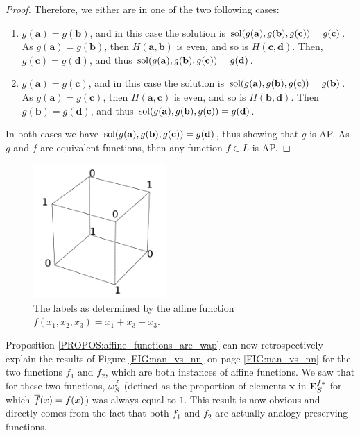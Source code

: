 \begin{proof}
  Therefore, we either are in one of the two following cases:
  \begin{enumerate}
    \item $g(\mathbf{a}) = g(\mathbf{b})$, and in this case the solution is
      $\text{sol}(g(\mathbf{a}), g(\mathbf{b}), g(\mathbf{c})) = g(\mathbf{c})$. As
      $g(\mathbf{a}) = g(\mathbf{b})$, then $H(\mathbf{a}, \mathbf{b})$ is
      even, and so is $H(\mathbf{c}, \mathbf{d})$. Then, $g(\mathbf{c}) =
      g(\mathbf{d})$, and thus $\text{sol}(g(\mathbf{a}), g(\mathbf{b}),
      g(\mathbf{c})) = g(\mathbf{d})$.
    \item $g(\mathbf{a}) = g(\mathbf{c})$, and in this case the solution is
      $\text{sol}(g(\mathbf{a}), g(\mathbf{b}), g(\mathbf{c})) = g(\mathbf{b})$. As
      $g(\mathbf{a}) = g(\mathbf{c})$, then $H(\mathbf{a}, \mathbf{c})$ is
      even, and so is $H(\mathbf{b}, \mathbf{d})$. Then $g(\mathbf{b}) =
      g(\mathbf{d})$, and thus $\text{sol}(g(\mathbf{a}), g(\mathbf{b}),
      g(\mathbf{c})) = g(\mathbf{d})$.
  \end{enumerate}

  In both cases we have $\text{sol}(g(\mathbf{a}), g(\mathbf{b}), g(\mathbf{c})) =
  g(\mathbf{d})$, thus showing that $g$ is AP.
  As $g$ and $f$ are equivalent functions, then any function $f \in L$ is AP.
\end{proof}

\begin{figure}[!h]
\centering
  \includegraphics[width=2in]{figures/affine_functions_neighbors.pdf}
  \caption{The labels as determined by the affine function $f(x_1, x_2, x_3) = x_1 + x_3 + x_3$.}
\label{FIG:affine_functions_neighbors}
\end{figure}

Proposition \ref{PROPOS:affine_functions_are_wap} can now retrospectively
explain the results of Figure \ref{FIG:nan_vs_nn} on page \ref{FIG:nan_vs_nn}
for the two functions $f_1$ and $f_2$, which are both instances of affine
functions. We saw that for these two functions, $\omega_{S}^{f}$ (defined as the
proportion of elements $\mathbf{x}$ in $\mathbf{E}_{S}^{f*}$ for which $\overline{f}(x) = f(x)$) was
always equal to $1$. This result is now obvious and directly comes from the
fact that both $f_1$ and $f_2$ are actually analogy preserving functions.

